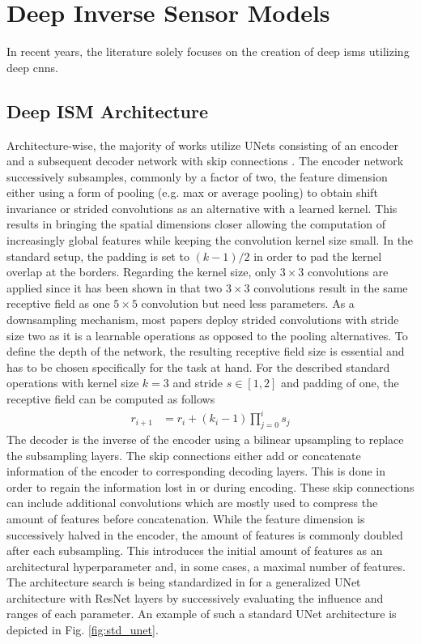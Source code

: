 \section{Deep Inverse Sensor Models}
\label{sec:deep_isms}
In recent years, the literature solely focuses on the creation of deep \gls{ism}s utilizing deep \gls{cnn}s. 
%
\subsection{Deep ISM Architecture}
\label{subsec:architecture}
Architecture-wise, the majority of works utilize UNets \cite{ronneberger2015u} consisting of an encoder and a subsequent decoder network with skip connections \cite{prophet2019semantic,sless2019road,wirges2018evidential,weston2019probably,schulter2018learning,lu2019monocular,mani2020monolayout}. The encoder network successively subsamples, commonly by a factor of two, the feature dimension either using a form of pooling (e.g. max or average pooling) to obtain shift invariance or strided convolutions as an alternative with a learned kernel. This results in bringing the spatial dimensions closer allowing the computation of increasingly global features while keeping the convolution kernel size small. In the standard setup, the padding is set to $(k-1)/2$ in order to pad the kernel overlap at the borders. Regarding the kernel size, only $3 \times 3$ convolutions are applied since it has been shown in \cite{simonyan2014very} that two $3 \times 3$ convolutions result in the same receptive field as one $5 \times 5$ convolution but need less parameters. As a downsampling mechanism, most papers deploy strided convolutions with stride size two as it is a learnable operations as opposed to the pooling alternatives. To define the depth of the network, the resulting receptive field size is essential and has to be chosen specifically for the task at hand. For the described standard operations with kernel size $k=3$ and stride $s \in [1,2]$ and padding of one, the receptive field can be computed as follows
\begin{align}
	\label{eq:receptive_field}
	r_{i+1} &= r_i + (k_i-1)\prod_{j=0}^{i}s_j
\end{align}
The decoder is the inverse of the encoder using a bilinear upsampling \cite{odena2016deconvolution} to replace the subsampling layers. The skip connections either add or concatenate information of the encoder to corresponding decoding layers. This is done in order to regain the information lost in or during encoding. These skip connections can include additional convolutions which are mostly used to compress the amount of features before concatenation. While the feature dimension is successively halved in the encoder, the amount of features is commonly doubled after each subsampling. This introduces the initial amount of features as an architectural hyperparameter and, in some cases, a maximal number of features. The architecture search is being standardized in \cite{radosavovic2020designing} for a generalized UNet architecture with ResNet layers by successively evaluating the influence and ranges of each parameter. An example of such a standard UNet architecture is depicted in Fig. \ref{fig:std_unet}.
